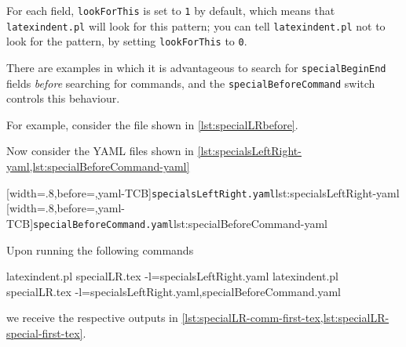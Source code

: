  For each field, \texttt{lookForThis} is set to \texttt{1} by default, which means that
 \texttt{latexindent.pl} will look for this pattern; you can tell \texttt{latexindent.pl}
 not to look for the pattern, by setting \texttt{lookForThis} to \texttt{0}.

 There are  examples in which it is
 advantageous to search for \texttt{specialBeginEnd} fields \emph{before} searching for
 commands, and the \texttt{specialBeforeCommand} switch controls this behaviour.

 \begin{example}
 For example, consider the file shown in \cref{lst:specialLRbefore}.%


 Now consider the YAML files shown in
 \cref{lst:specialsLeftRight-yaml,lst:specialBeforeCommand-yaml}

 \begin{cmhtcbraster}
  [width=.8\linewidth,before=\centering,yaml-TCB]{\texttt{specialsLeftRight.yaml}}{lst:specialsLeftRight-yaml}
  [width=.8\linewidth,before=\centering,yaml-TCB]{\texttt{specialBeforeCommand.yaml}}{lst:specialBeforeCommand-yaml}
 \end{cmhtcbraster}

 Upon running the following commands 
 \begin{widepage}

  \begin{commandshell}
latexindent.pl specialLR.tex -l=specialsLeftRight.yaml      
latexindent.pl specialLR.tex -l=specialsLeftRight.yaml,specialBeforeCommand.yaml      
\end{commandshell}

 \end{widepage}
 we receive the respective outputs in
 \cref{lst:specialLR-comm-first-tex,lst:specialLR-special-first-tex}.

 \begin{minipage}{.49\linewidth}
 \end{minipage}
 \hfill
 \begin{minipage}{.49\linewidth}
 \end{minipage}


\end{example}
